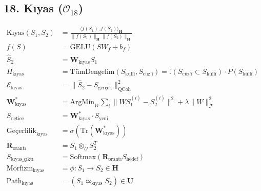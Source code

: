 \documentclass[11pt, a4paper]{article}
\begin{document}
\subsection{18. Kıyas ($\mathcal{O}_{18}$)}
\begin{align}
\text{Kıyas}(S_1, S_2) &= \frac{\langle f(S_1), f(S_2) \rangle_{\mathbf{H}}}{\|f(S_1)\|_{\mathbf{H}} \|f(S_2)\|_{\mathbf{H}}} \\
f(S) &= \text{GELU}(S W_f + b_f) \\
\hat{S}_2 &= \mathbf{W}_{\text{kıyas}} S_1 \\
H_{\text{kıyas}} &= \text{TümDengelim}(S_{\text{küllî}}, S_{\text{cüz'î}}) = \mathbb{I}(S_{\text{cüz'î}} \subset S_{\text{küllî}}) \cdot P(S_{\text{küllî}}) \\
\mathcal{E}_{\text{kıyas}} &= \| \hat{S}_2 - S_{\text{gerçek}} \|_{\text{QCoh}}^2 \\
\mathbf{W}_{\text{kıyas}}^* &= \text{ArgMin}_W \sum_i \| W S_1^{(i)} - S_2^{(i)} \|^2 + \lambda \|W\|_{\mathcal{F}}^2 \\
S_{\text{netice}} &= \mathbf{W}_{\text{kıyas}}^* \cdot S_{\text{yeni}} \\
\text{Geçerlilik}_{\text{kıyas}} &= \sigma(\text{Tr}(\mathbf{W}_{\text{kıyas}}^*)) \\
\mathbf{R}_{\text{orantı}} &= S_1 \otimes_{\mathcal{O}} S_2^T \\
S_{\text{kıyas\_çıktı}} &= \text{Softmax}(\mathbf{R}_{\text{orantı}} S_{\text{hedef}}) \\
\text{Morfizm}_{\text{kıyas}} &= \phi : S_1 \to S_2 \in \mathbf{H} \\
\text{Path}_{\text{kıyas}} &= (S_1 \simeq_{\text{kıyas}} S_2) \in \mathbf{U}
\end{align}
\end{document}
